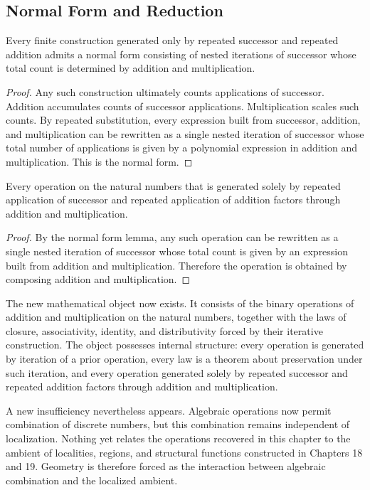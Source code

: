 \documentclass[12pt,anyside]{book}
\begin{document}
\subsection{Normal Form and Reduction}
\begin{lemma}
Every finite construction generated only by repeated successor and repeated addition admits a normal form consisting of nested iterations of successor whose total count is determined by addition and multiplication.
\end{lemma}

\begin{proof}
Any such construction ultimately counts applications of successor. Addition accumulates counts of successor applications. Multiplication scales such counts. By repeated substitution, every expression built from successor, addition, and multiplication can be rewritten as a single nested iteration of successor whose total number of applications is given by a polynomial expression in addition and multiplication. This is the normal form.
\end{proof}

\begin{theorem}
Every operation on the natural numbers that is generated solely by repeated application of successor and repeated application of addition factors through addition and multiplication.
\end{theorem}

\begin{proof}
By the normal form lemma, any such operation can be rewritten as a single nested iteration of successor whose total count is given by an expression built from addition and multiplication. Therefore the operation is obtained by composing addition and multiplication.
\end{proof}

The new mathematical object now exists. It consists of the binary operations of addition and multiplication on the natural numbers, together with the laws of closure, associativity, identity, and distributivity forced by their iterative construction. The object possesses internal structure: every operation is generated by iteration of a prior operation, every law is a theorem about preservation under such iteration, and every operation generated solely by repeated successor and repeated addition factors through addition and multiplication.

A new insufficiency nevertheless appears. Algebraic operations now permit combination of discrete numbers, but this combination remains independent of localization. Nothing yet relates the operations recovered in this chapter to the ambient of localities, regions, and structural functions constructed in Chapters 18 and 19. Geometry is therefore forced as the interaction between algebraic combination and the localized ambient.
\end{document}
